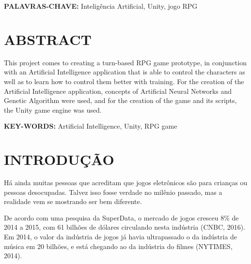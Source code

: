 \documentclass[12pt,a4paper]{article}
\begin{document}
	\vspace{0.8cm}
	\noindent
	\textbf{PALAVRAS-CHAVE:} Inteligência Artificial, Unity, jogo RPG

\onehalfspacing

\newpage %
\thispagestyle{empty} %
\section*{\hfil ABSTRACT} %
	\singlespace
	\noindent
	This project comes to creating a turn-based RPG game prototype,
	in conjunction with an Artificial Intelligence application that is able to control the characters
	as well as to learn how to control them better with training.
	For the creation of the Artificial Intelligence application,
	concepts of Artificial Neural Networks and Genetic Algorithm were used,
	and for the creation of the game and its scripts,
	the Unity game engine was used.
	
	\vspace{0.8cm}
	\noindent
	\textbf{KEY-WORDS:} Artificial Intelligence, Unity, RPG game

\onehalfspacing

\newpage %
\thispagestyle{empty} %
\listoffigures %

\newpage %
\thispagestyle{empty} %
\listoftables %

\newpage %
\thispagestyle{empty} %
\tableofcontents %

\newpage %
\section{INTRODUÇÃO}
	Há ainda muitas pessoas que acreditam que jogos eletrônicos são para crianças ou pessoas desocupadas.
	Talvez isso fosse verdade no milênio passado, mas a realidade vem se mostrando ser bem diferente.
	
	De acordo com uma pesquisa da SuperData,
	o mercado de jogos cresceu 8\% de 2014 a 2015,
	com 61 bilhões de dólares circulando nesta indústria (CNBC, 2016).
	Em 2014, o valor da indústria de jogos já havia ultrapassado o da indústria de música em 20 bilhões,
	e está chegando ao da indústria do filmes (NYTIMES, 2014).
	
\end{document}
